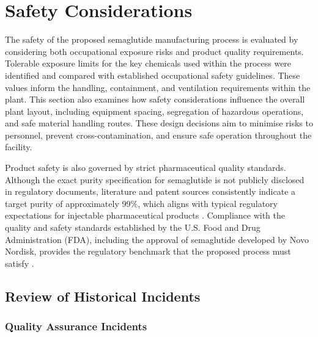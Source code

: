 \section{Safety Considerations}

The safety of the proposed semaglutide manufacturing process is evaluated by considering both occupational exposure risks and product quality requirements. Tolerable exposure limits for the key chemicals used within the process were identified and compared with established occupational safety guidelines. These values inform the handling, containment, and ventilation requirements within the plant. This section also examines how safety considerations influence the overall plant layout, including equipment spacing, segregation of hazardous operations, and safe material handling routes. These design decisions aim to minimise risks to personnel, prevent cross-contamination, and ensure safe operation throughout the facility.

Product safety is also governed by strict pharmaceutical quality standards. Although the exact purity specification for semaglutide is not publicly disclosed in regulatory documents, literature and patent sources consistently indicate a target purity of approximately 99\%, which aligns with typical regulatory expectations for injectable pharmaceutical products \cite{Ashraf_semaglutide_2024, EP4181946A1_semaglutide_purification}. Compliance with the quality and safety standards established by the U.S. Food and Drug Administration (FDA), including the approval of semaglutide developed by Novo Nordisk, provides the regulatory benchmark that the proposed process must satisfy \cite{FDA_DrugsAtFDA, FDA_semaglutide_ChemR_2019}.

\subsection{Review of Historical Incidents}

\subsubsection{Quality Assurance Incidents}

